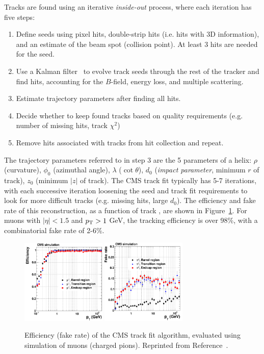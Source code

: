 Tracks are found using an iterative \emph{inside-out} process, where each iteration has five steps:
\begin{enumerate}
    \item Define seeds using pixel hits, double-strip hits (i.e. hits with 3D information), and an estimate of the beam spot (collision point). At least 3 hits are needed for the seed.
    \item Use a Kalman filter~\cite{kalman2,kalman1} to evolve track seeds through the rest of the tracker and find hits, accounting for the $B$-field, energy loss, and multiple scattering.
    \item Estimate trajectory parameters after finding all hits.
    \item Decide whether to keep found tracks based on quality requirements (e.g. number of missing hits, track $\chi^2$)
    \item Remove hits associated with tracks from hit collection and repeat.
\end{enumerate}
The trajectory parameters referred to in step 3 are the 5 parameters of a helix: $\rho$ (curvature), $\phi_0$ (azimuthal angle), $\lambda$ ($\cot\theta$), $d_0$ (\emph{impact parameter}, minimum $r$ of track), $z_0$ (minimum $|z|$ of track).
The CMS track fit typically has 5-7 iterations, with each successive iteration loosening the seed and track fit requirements to look for more difficult tracks (e.g. missing hits, large $d_0$).
The efficiency and fake rate of this reconstruction, as a function of track \pt, are shown in Figure~\ref{fig:cms:trackeff}.
For muons with $|\eta|<1.5$ and $p_\mathrm{T}>1$ GeV, the tracking efficiency is over 98\%, with a combinatorial fake rate of 2-6\%. 

\begin{figure}[]
    \begin{center} 
        \includegraphics[width=0.36\textwidth]{figures/cms/track_eff.png}
        \includegraphics[width=0.36\textwidth]{figures/cms/track_fake.png}
        \caption{Efficiency (fake rate) of the CMS track fit algorithm, evaluated using simulation of muons (charged pions).
                 Reprinted from Reference~\cite{cmstracker}.}
        \label{fig:cms:trackeff}
    \end{center}
\end{figure}

